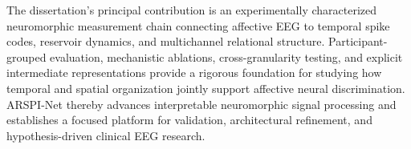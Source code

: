 \documentclass[12pt]{report}
\theoremstyle{definition}
\theoremstyle{remark}
\begin{document}
The dissertation's principal contribution is an experimentally characterized neuromorphic measurement chain connecting affective EEG to temporal spike codes, reservoir dynamics, and multichannel relational structure. Participant-grouped evaluation, mechanistic ablations, cross-granularity testing, and explicit intermediate representations provide a rigorous foundation for studying how temporal and spatial organization jointly support affective neural discrimination. ARSPI-Net thereby advances interpretable neuromorphic signal processing and establishes a focused platform for validation, architectural refinement, and hypothesis-driven clinical EEG research.

\clearpage
\tableofcontents
\clearpage
\listoffigures
\clearpage
\listoftables
\clearpage

\setcounter{page}{1}

\newpage

\newpage

\newpage

\newpage

\newpage

\newpage

\newpage

\clearpage
{}
{}


\clearpage

\end{document}
